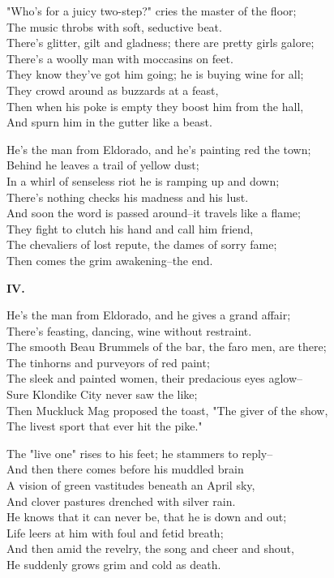 \begin{poemblock}
"Who's for a juicy two-step?" cries the master of the floor;\\
\idt The music throbs with soft, seductive beat.\\
There's glitter, gilt and gladness; there are pretty girls galore;\\
\idt There's a woolly man with moccasins on feet.\\
They know they've got him going; he is buying wine for all;\\
\idt They crowd around as buzzards at a feast,\\
Then when his poke is empty they boost him from the hall,\\
\idt And spurn him in the gutter like a beast.

He's the man from Eldorado, and he's painting red the town;\\
\idt Behind he leaves a trail of yellow dust;\\
In a whirl of senseless riot he is ramping up and down;\\
\idt There's nothing checks his madness and his lust.\\
And soon the word is passed around--it travels like a flame;\\
\idt They fight to clutch his hand and call him friend,\\
The chevaliers of lost repute, the dames of sorry fame;\\
\idt Then comes the grim awakening--the end.

\textbf{IV.}

He's the man from Eldorado, and he gives a grand affair;\\
\idt There's feasting, dancing, wine without restraint.\\
The smooth Beau Brummels of the bar, the faro men, are there;\\
\idt The tinhorns and purveyors of red paint;\\
The sleek and painted women, their predacious eyes aglow--\\
\idt Sure Klondike City never saw the like;\\
Then Muckluck Mag proposed the toast, "The giver of the show,\\
\idt The livest sport that ever hit the pike."

The "live one" rises to his feet; he stammers to reply--\\
\idt And then there comes before his muddled brain\\
A vision of green vastitudes beneath an April sky,\\
\idt And clover pastures drenched with silver rain.\\
He knows that it can never be, that he is down and out;\\
\idt Life leers at him with foul and fetid breath;\\
And then amid the revelry, the song and cheer and shout,\\
\idt He suddenly grows grim and cold as death.


\end{poemblock}
